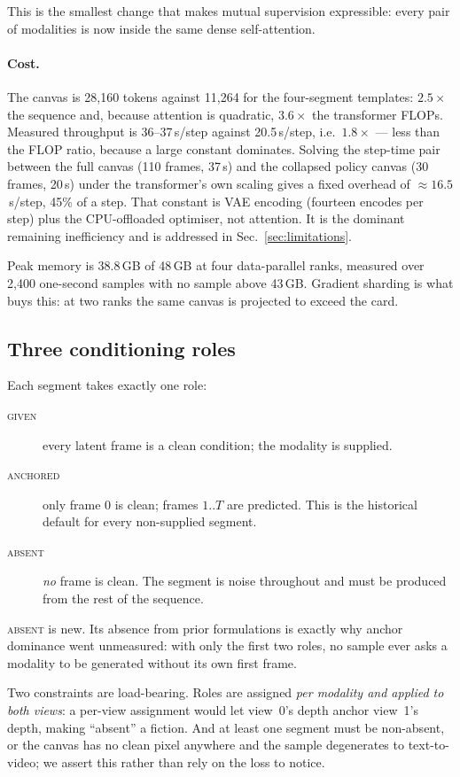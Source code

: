 \documentclass{article}
\begin{document}
This is the smallest change that makes mutual supervision expressible: every pair of modalities
is now inside the same dense self-attention.

\paragraph{Cost.} The canvas is 28{,}160 tokens against 11{,}264 for the four-segment templates:
$2.5\times$ the sequence and, because attention is quadratic, $3.6\times$ the transformer FLOPs.
Measured throughput is 36--37\,s/step against 20.5\,s/step, i.e.\ $1.8\times$ --- less than the
FLOP ratio, because a large constant dominates. Solving the step-time pair between the full
canvas (110 frames, 37\,s) and the collapsed policy canvas (30 frames, 20\,s) under the
transformer's own scaling gives a fixed overhead of $\approx\!16.5$\,s/step, 45\% of a step. That
constant is VAE encoding (fourteen encodes per step) plus the CPU-offloaded optimiser, not
attention. It is the dominant remaining inefficiency and is addressed in
Sec.~\ref{sec:limitations}.

Peak memory is 38.8\,GB of 48\,GB at four data-parallel ranks, measured over 2{,}400
one-second samples with no sample above 43\,GB. Gradient sharding is what buys this: at two ranks
the same canvas is projected to exceed the card.

\subsection{Three conditioning roles}
\label{sec:roles}

Each segment takes exactly one role:
\begin{description}
\item[\textsc{given}] every latent frame is a clean condition; the modality is supplied.
\item[\textsc{anchored}] only frame 0 is clean; frames $1..T$ are predicted. This is the
      historical default for every non-supplied segment.
\item[\textsc{absent}] \emph{no} frame is clean. The segment is noise throughout and must be
      produced from the rest of the sequence.
\end{description}
\textsc{absent} is new. Its absence from prior formulations is exactly why anchor dominance went
unmeasured: with only the first two roles, no sample ever asks a modality to be generated without
its own first frame.

Two constraints are load-bearing. Roles are assigned \emph{per modality and applied to both
views}: a per-view assignment would let view~0's depth anchor view~1's depth, making ``absent'' a
fiction. And at least one segment must be non-absent, or the canvas has no clean pixel anywhere
and the sample degenerates to text-to-video; we assert this rather than rely on the loss to
notice.
\end{document}

